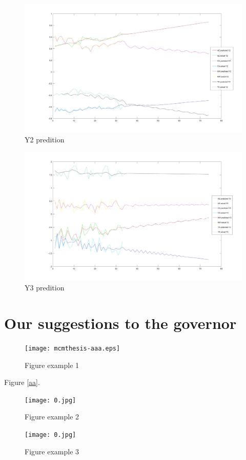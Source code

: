\documentclass{mcmthesis}
\begin{document}
        \begin{figure}[!hbpt]
          \centering
          \includegraphics[width=450px]{Y2.jpg}
          \caption{Y2 predition}\label{1}
        \end{figure}

        \begin{figure}[!hbpt]
          \centering
          \includegraphics[width=450px]{Y3.jpg}
          \caption{Y3 predition}\label{2}
        \end{figure}


\section{Our suggestions to the governor}
\begin{figure}[h]
\centering
\texttt{[image: mcmthesis-aaa.eps]}
\caption{Figure example 1} \label{fig:aa}
\end{figure}


Figure \ref{aa}.

\begin{figure}[h]
\begin{minipage}[h]{0.5\linewidth}
\centering
\texttt{[image: 0.jpg]}
\caption{Figure example 2}
\end{minipage}
\begin{minipage}[h]{0.5\linewidth}
\centering
\texttt{[image: 0.jpg]}
\caption{Figure example 3}
\end{minipage}
\end{figure}
\end{document}
